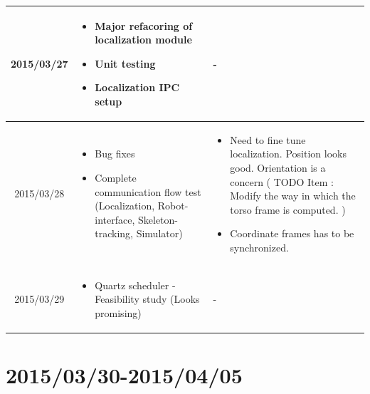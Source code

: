 \documentclass[11pt]{article} %
\begin{document}
\begin{center}
\begin{longtable}{ | c | p{6cm} | p{5cm} |}
  2015/03/27         & 
  \begin{itemize}
  \item Major refacoring of localization module
  \item Unit testing
  \item Localization IPC setup
\end{itemize}   
  & 
- \\
  										 \hline
  										 
	 2015/03/28         & 
  \begin{itemize}
  \item Bug fixes
  \item Complete communication flow test (Localization, Robot-interface, Skeleton-tracking, Simulator)
\end{itemize}   
  & 
\begin{itemize}
\item Need to fine tune localization. Position looks good. Orientation is a concern ( TODO Item : Modify the way in which the torso frame is computed. )
\item Coordinate frames has to be synchronized.
\end{itemize}			\\					 \hline  	

2015/03/29         & 
  \begin{itemize}
  \item Quartz scheduler - Feasibility study (Looks promising)
\end{itemize}   
  & 
-  					\\					 \hline  										 
  										   										 
    \end{longtable}
\end{center}

\newpage
\section{2015/03/30-2015/04/05}
\end{document}
